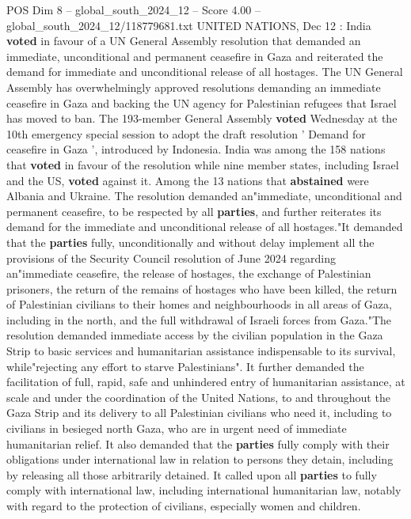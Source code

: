 \begin{textsample}{POS Dim 8 – global\_south\_2024\_12 – Score 4.00 – global\_south\_2024\_12/118779681.txt}  \label{ex:f8_pos_357}
UNITED NATIONS, Dec 12 : India \textbf{voted} in favour of a UN General Assembly resolution that demanded an immediate, unconditional and permanent ceasefire in Gaza and reiterated the demand for immediate and unconditional release of all hostages.
The UN General Assembly has overwhelmingly approved resolutions demanding an immediate ceasefire in Gaza and backing the UN agency for Palestinian refugees that Israel has moved to ban.
The 193-member General Assembly \textbf{voted} Wednesday at the 10th emergency special session to adopt the draft resolution ' Demand for ceasefire in Gaza ', introduced by Indonesia.
India was among the 158 nations that \textbf{voted} in favour of the resolution while nine member states, including Israel and the US, \textbf{voted} against it.
Among the 13 nations that \textbf{abstained} were Albania and Ukraine.
The resolution demanded an"immediate, unconditional and permanent ceasefire, to be respected by all \textbf{parties}, and further reiterates its demand for the immediate and unconditional release of all hostages."It demanded that the \textbf{parties} fully, unconditionally and without delay implement all the provisions of the Security Council resolution of June 2024 regarding an"immediate ceasefire, the release of hostages, the exchange of Palestinian prisoners, the return of the remains of hostages who have been killed, the return of Palestinian civilians to their homes and neighbourhoods in all areas of Gaza, including in the north, and the full withdrawal of Israeli forces from Gaza."The resolution demanded immediate access by the civilian population in the Gaza Strip to basic services and humanitarian assistance indispensable to its survival, while"rejecting any effort to starve Palestinians".
It further demanded the facilitation of full, rapid, safe and unhindered entry of humanitarian assistance, at scale and under the coordination of the United Nations, to and throughout the Gaza Strip and its delivery to all Palestinian civilians who need it, including to civilians in besieged north Gaza, who are in urgent need of immediate humanitarian relief.
It also demanded that the \textbf{parties} fully comply with their obligations under international law in relation to persons they detain, including by releasing all those arbitrarily detained.
It called upon all \textbf{parties} to fully comply with international law, including international humanitarian law, notably with regard to the protection of civilians, especially women and children.

\end{textsample}
